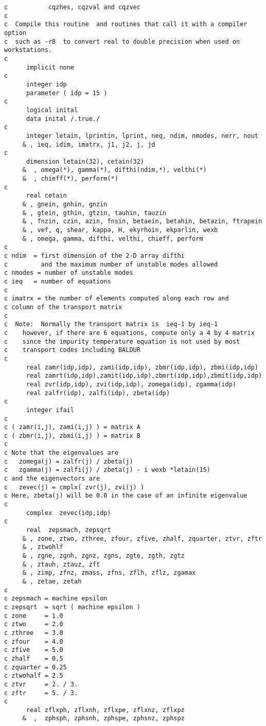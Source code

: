 \begin{verbatim}
c           cqzhes, cqzval and cqzvec
c
c  Compile this routine  and routines that call it with a compiler option 
c  such as -r8  to convert real to double precision when used on workstations.
c
      implicit none
c
      integer idp
      parameter ( idp = 15 )
c
      logical inital
      data inital /.true./
c
      integer letain, lprintin, lprint, neq, ndim, nmodes, nerr, nout
     & , ieq, idim, imatrx, j1, j2, j, jd
c
      dimension letain(32), cetain(32)
     &  , omega(*), gamma(*), difthi(ndim,*), velthi(*)
     &  , chieff(*), perform(*)
c
      real cetain
     & , gnein, gnhin, gnzin
     & , gtein, gthin, gtzin, tauhin, tauzin
     & , fnzin, czin, azin, fnsin, betaein, betahin, betazin, ftrapein
     & , vef, q, shear, kappa, H, ekyrhoin, ekparlin, wexb
     & , omega, gamma, difthi, velthi, chieff, perform
c
c ndim  = first dimension of the 2-D array difthi
c         and the maximum number of unstable modes allowed
c nmodes = number of unstable modes
c ieq   = number of equations
c
c imatrx = the number of elements computed along each row and
c column of the transport matrix
c
c  Note:  Normally the transport matrix is  ieq-1 by ieq-1
c    however, if there are 6 equations, compute only a 4 by 4 matrix
c    since the impurity temperature equation is not used by most
c    transport codes including BALDUR
c
      real zamr(idp,idp), zami(idp,idp), zbmr(idp,idp), zbmi(idp,idp)
      real zamrt(idp,idp),zamit(idp,idp),zbmrt(idp,idp),zbmit(idp,idp)
      real zvr(idp,idp), zvi(idp,idp), zomega(idp), zgamma(idp)
      real zalfr(idp), zalfi(idp), zbeta(idp)
c
      integer ifail
c
c ( zamr(i,j), zami(i,j) ) = matrix A
c ( zbmr(i,j), zbmi(i,j) ) = matrix B
c
c Note that the eigenvalues are
c   zomega(j) = zalfr(j) / zbeta(j)
c   zgamma(j) = zalfi(j) / zbeta(j) - i wexb *letain(15)
c and the eigenvectors are
c   zevec(j) = cmplx( zvr(j), zvi(j) )
c Here, zbeta(j) will be 0.0 in the case of an infinite eigenvalue
c
      complex  zevec(idp,idp)
c
      real  zepsmach, zepsqrt
     & , zone, ztwo, zthree, zfour, zfive, zhalf, zquarter, ztvr, zftr
     & , ztwohlf
     & , zgne, zgnh, zgnz, zgns, zgte, zgth, zgtz
     & , ztauh, ztauz, zft
     & , zimp, zfnz, zmass, zfns, zflh, zflz, zgamax
     & , zetae, zetah
c
c zepsmach = machine epsilon
c zepsqrt  = sqrt ( machine epsilon )
c zone     = 1.0
c ztwo     = 2.0
c zthree   = 3.0
c zfour    = 4.0
c zfive    = 5.0
c zhalf    = 0.5
c zquarter = 0.25
c ztwohalf = 2.5
c ztvr     = 2. / 3.
c zftr     = 5. / 3.
c
      real zflxph, zflxnh, zflxpe, zflxnz, zflxpz
     &  ,  zphsph, zphsnh, zphspe, zphsnz, zphspz

\end{verbatim}
